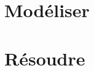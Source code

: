 \documentclass[10pt,fleqn]{book} %
\newcommand{\repStyle}{../../Style}
\begin{document}
\def\xxcompetences{}
\def\xxfigures{}

\graphicspath{{\repStyle/png/}}



\setlength{\columnseprule}{.1pt}

\chapter{Modéliser}


\pagestyle{fancy}
\thispagestyle{plain}
%

\stopcontents

\chapter{Résoudre}
%
%

\stopcontents

\newpage
\printindex
\end{document}
